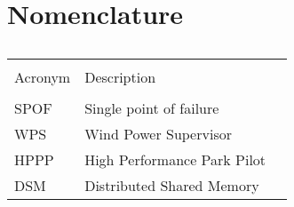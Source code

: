 \chapter{Nomenclature}


\begin{table}[ht]
\caption[Nomenclature]{\textsc{}} %
\centering %
\begin{tabular}{l l l} %
\hline\hline\\ %
 Acronym & Description \\ [0.5ex] %
\hline\\ %

	SPOF & Single point of failure \\
	WPS &  Wind Power Supervisor\\
	HPPP &  High Performance Park Pilot\\
	DSM &  Distributed Shared Memory\\[1ex] %

\hline %
\end{tabular}
\normalsize
\label{table:nomenclature} %
\end{table}


